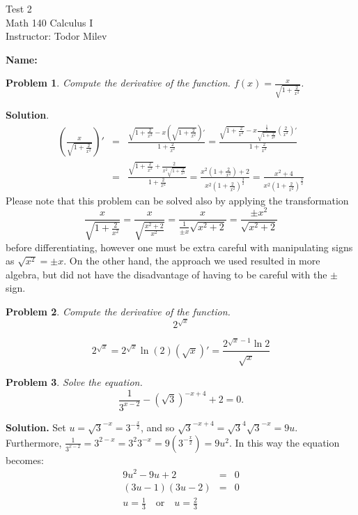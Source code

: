 \documentclass{article}
\newtheorem{problem}{Problem}
\begin{document}
\begin{center}
\Large
Test 2\\ Math 140 Calculus I \\ \normalsize Instructor: Todor Milev
\end{center}
\textbf{Name:} 
\begin{problem}
Compute the derivative of the function.
$f(x)=\frac{x }{\sqrt{1+\frac{2}{x^2}}}$.
\end{problem}
\textbf{Solution}. 
\[
\begin{array}{rclr|r}
\displaystyle\left(\frac{x }{\sqrt{1+\frac{2}{x^2}}}\right)'&=&\displaystyle\frac{\sqrt{1+\frac{2}{x^2}}- x\left(\sqrt{1+\frac{2}{x^2}}\right)'}{1+\frac{2}{x^2}} =\frac{\sqrt{1+\frac{2}{x^2}}-  x\frac{\frac12}{\sqrt{1 +\frac{ 2}{ x^2 }}}  \left(\frac{2}{x^2}\right)'}{1+\frac{2}{x^2}}\\
&=& \displaystyle\frac{\sqrt{1+\frac{2}{x^2}}+  \frac{2}{x^2\sqrt{1 +\frac{ 2}{ x^2 }}} }{1+\frac{2}{x^2}} =
 \frac{x^2\left(1+\frac{2}{x^2}\right)+  2 }{x^2\left(1+\frac{2}{x^2}\right)^{\frac32}}= \frac{x^2+4}{x^2\left(1+\frac{2}{x^2}\right)^{\frac32}}
\end{array}
\]
Please note that this problem can be solved also by applying the transformation 
\[
\displaystyle  \frac{x}{\sqrt{1+\frac{2}{x^2}}}=\frac{x}{\sqrt{\frac{x^2+2}{x^2}}} =\frac{x}{\frac{1}{\pm x}\sqrt{x^2+2}} = \frac{\pm x^2}{\sqrt{x^2+2}}
\]
before differentiating, however one must be extra careful with manipulating signs as $\sqrt{x^2}=\pm x$. On the other hand, the approach we used resulted in more algebra, but did not have the disadvantage of having to be careful with the $\pm$ sign.
\begin{problem}Compute the derivative of the function.
\[2^{\sqrt{x}}
\]
\end{problem}
\[
2^{\sqrt{x}}= 2^{\sqrt{x}} \ln (2) (\sqrt{x})'= \frac{2^{\sqrt{x}- 1}\ln 2}{\sqrt{x}}
\]
\begin{problem}Solve the equation.
\[
\frac{1}{3^{x-2}}-\left(\sqrt{3}\right)^{-x+4}+2=0.
\] 
\end{problem}
\textbf{Solution.} Set $\displaystyle u=\sqrt{3}^{-x}= 3^{-\frac{x}2}$, and so $\sqrt{3}^{-x+4}=\sqrt{3}^4\sqrt{3}^{-x}= 9u$. Furthermore, $\frac{1}{3^{x-2}} = 3^{2-x}= 3^2 3^{-x}= 9\left(3 ^{-\frac{x}2}\right)= 9u^2 $. In this way the equation becomes:
\begin{equation}
\begin{array}{rcl}
9u^2-9u+2&=&0\\
(3u-1)(3u-2)&=&0\\
u=\frac{1}3  \quad \text{or}   \quad u=\frac{2}3
\end{array}
\end{equation}
\end{document}
